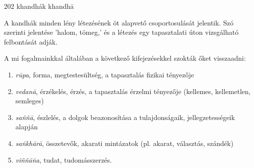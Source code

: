 
\begin{notesdescription}

\item[{202}
{khandhák}
{khandhā}] \hfill\par

A kandhák minden lény létezésének öt alapvető csoportosulását jelentik. Szó szerinti jelentése 'halom, tömeg,' és a létezés egy tapasztalati úton vizsgálható felbontását adják.

A mi fogalmainkkal általában a következő kifejezésekkel szokták őket visszaadni:

\begin{enumerate}
    \item \textit{r\=upa}, forma, megtestesültség, a tapasztalás fizikai tényezője
    \item \textit{vedan\=a}, érzékelés, érzés, a tapasztalás érzelmi tényezője (kellemes, kellemetlen, semleges)
    \item \textit{sa\~n\~n\=a}, észlelés, a dolgok beazonosítása a tulajdonságaik, jellegzetességeik alapján
    \item \textit{sa\.nkh\=ar\=a}, összetevők, akarati mintázatok (pl. akarat, választás, szándék)
    \item \textit{vi\~n\~n\=a\.na}, tudat, tudomásszerzés.
\end{enumerate}

\end{notesdescription}

